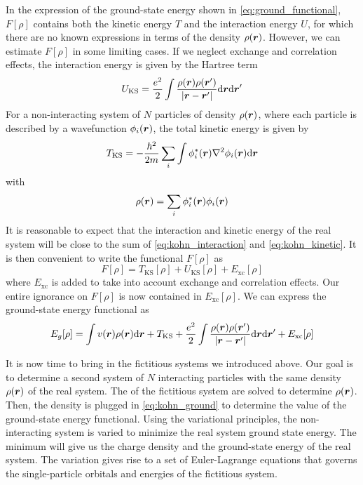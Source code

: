 In the expression of the ground-state energy shown in \cref{eq:ground_functional}, $F[\rho]$ contains both the kinetic energy $T$ and the interaction energy $U$, for which there are no known expressions in terms of the density $\rho(\mathbf{\boldsymbol{r}})$. However, we can estimate $F[\rho]$ in some limiting cases. If we neglect exchange and correlation effects, the interaction energy is given by the Hartree term
\begin{equation} \label{eq:kohn_interaction}
    U_\text{KS} = \frac{e^2}{2} \int \frac{\rho(\vec{r})\rho(\vec{r}')}{|\vec{r}-\vec{r}'|}  \dr \dr'
\end{equation}
For a non-interacting system of $N$ particles of density $\rho(\mathbf{\boldsymbol{r}})$, where each particle is described by a wavefunction $\phi_i(\mathbf{\boldsymbol{r}})$, the total kinetic energy is given by
\begin{equation} \label{eq:kohn_kinetic}
    T_\text{KS} = -\frac{\hbar^2}{2m}\sum_i \int \rr{\phi_i^*} \laplacian \rr{\phi_i} \dr
\end{equation}
with
\begin{equation}
    \rho(\mathbf{\boldsymbol{r}}) = \sum_i \phi_i^*(\mathbf{\boldsymbol{r}})\phi_i(\mathbf{\boldsymbol{r}})
\end{equation}
It is reasonable to expect that the interaction and kinetic energy of the real system will be close to the sum of \cref{eq:kohn_interaction} and \cref{eq:kohn_kinetic}. It is then convenient to write the functional $F[\rho]$ as
\begin{equation}
    F[\rho] = T_\text{KS}[\rho] + U_\text{KS}[\rho] + E_\text{xc}[\rho]
\end{equation}
where $E_\text{xc}$ is added to take into account exchange and correlation effects. Our entire ignorance on $F[\rho]$ is now contained in $E_\text{xc}[\rho]$.  We can express the ground-state energy functional as
\begin{equation} \label{eq:kohn_ground}
    E_g[\rho] = \int \rr{v} \rr{\rho} \dr +  T_\text{KS} + \frac{e^2}{2} \int \frac{\rho(\vec{r})\rho(\vec{r}')}{|\vec{r}-\vec{r}'|}  \dr \dr' + E_\text{xc}[\rho]
\end{equation}

It is now time to bring in the fictitious systems we introduced above. Our goal is to determine a second system of $N$ interacting particles with the same density $\rho(\mathbf{\boldsymbol{r}})$ of the real system. The \sche of the fictitious system are solved to determine $\rho(\mathbf{\boldsymbol{r}})$. Then, the density is plugged in \cref{eq:kohn_ground} to determine the value of the ground-state energy functional. Using the variational principles, the non-interacting system is varied to minimize the real system ground state energy. The minimum will give us the charge density and the ground-state energy of the real system. The variation gives rise to a set of Euler-Lagrange equations that governs the single-particle orbitals and energies of the fictitious system.

